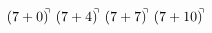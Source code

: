 \documentclass[preview]{standalone}
\begin{document}
\begin{align*}
(7+0)^{\hspace{-0.1cm}\urcorner} \ (7+4)^{\hspace{-0.1cm}\urcorner} \ (7+7)^{\hspace{-0.1cm}\urcorner} \ (7+10)^{\hspace{-0.1cm}\urcorner}
\end{align*}
\end{document}
